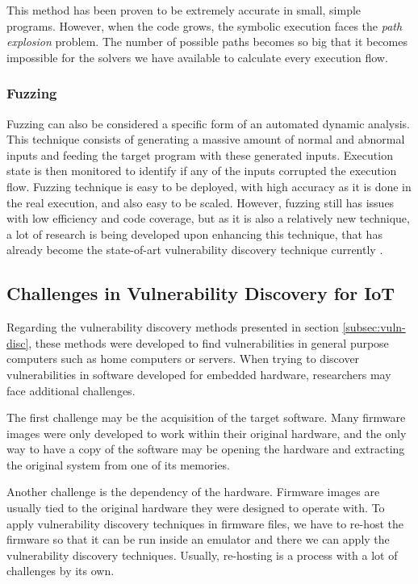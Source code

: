 This method has been proven to be extremely accurate in small, simple programs. However, when the code grows, the symbolic execution faces the \textit{path explosion} problem. The number of possible paths becomes so big that it becomes impossible for the solvers we have available to calculate every execution flow.

\subsubsection{Fuzzing}

Fuzzing can also be considered a specific form of an automated dynamic analysis. This technique consists of generating a massive amount of normal and abnormal inputs and feeding the target program with these generated inputs. Execution state is then monitored to identify if any of the inputs corrupted the execution flow. Fuzzing technique is easy to be deployed, with high accuracy as it is done in the real execution, and also easy to be scaled. However, fuzzing still has issues with low efficiency and code coverage, but as it is also a relatively new technique, a lot of research is being developed upon enhancing this technique, that has already become the state-of-art vulnerability discovery technique currently \cite{fuzzing}.


\subsection{Challenges in Vulnerability Discovery for IoT}

Regarding the vulnerability discovery methods presented in section \ref{subsec:vuln-disc}, these methods were developed to find vulnerabilities in general purpose computers such as home computers or servers. When trying to discover vulnerabilities in software developed for embedded hardware, researchers may face additional challenges.

The first challenge may be the acquisition of the target software. Many firmware images were only developed to work within their original hardware, and the only way to have a copy of the software may be opening the hardware and extracting the original system from one of its memories.

Another challenge is the dependency of the hardware. Firmware images are usually tied to the original hardware they were designed to operate with. To apply vulnerability discovery techniques in firmware files, we have to re-host the firmware so that it can be run inside an emulator and there we can apply the vulnerability discovery techniques. Usually, re-hosting is a process with a lot of challenges by its own.

